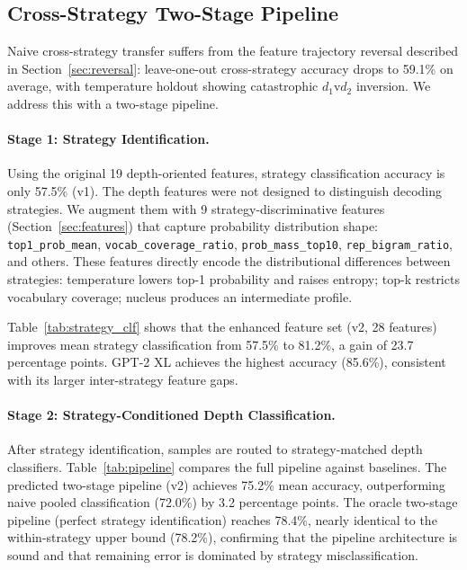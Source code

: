 \documentclass[11pt,a4paper]{article}
\begin{document}
\subsection{Cross-Strategy Two-Stage Pipeline}
\label{sec:twostage}

Naive cross-strategy transfer suffers from the feature trajectory reversal described in Section~\ref{sec:reversal}: leave-one-out cross-strategy accuracy drops to 59.1\% on average, with temperature holdout showing catastrophic $d_1$v$d_2$ inversion. We address this with a two-stage pipeline.

\paragraph{Stage 1: Strategy Identification.}
Using the original 19 depth-oriented features, strategy classification accuracy is only 57.5\% (v1). The depth features were not designed to distinguish decoding strategies. We augment them with 9 strategy-discriminative features (Section~\ref{sec:features}) that capture probability distribution shape: \texttt{top1\_prob\_mean}, \texttt{vocab\_coverage\_ratio}, \texttt{prob\_mass\_top10}, \texttt{rep\_bigram\_ratio}, and others. These features directly encode the distributional differences between strategies: temperature lowers top-1 probability and raises entropy; top-k restricts vocabulary coverage; nucleus produces an intermediate profile.

Table~\ref{tab:strategy_clf} shows that the enhanced feature set (v2, 28 features) improves mean strategy classification from 57.5\% to 81.2\%, a gain of 23.7 percentage points. GPT-2 XL achieves the highest accuracy (85.6\%), consistent with its larger inter-strategy feature gaps.

\paragraph{Stage 2: Strategy-Conditioned Depth Classification.}
After strategy identification, samples are routed to strategy-matched depth classifiers. Table~\ref{tab:pipeline} compares the full pipeline against baselines. The predicted two-stage pipeline (v2) achieves 75.2\% mean accuracy, outperforming naive pooled classification (72.0\%) by 3.2 percentage points. The oracle two-stage pipeline (perfect strategy identification) reaches 78.4\%, nearly identical to the within-strategy upper bound (78.2\%), confirming that the pipeline architecture is sound and that remaining error is dominated by strategy misclassification.
\end{document}
